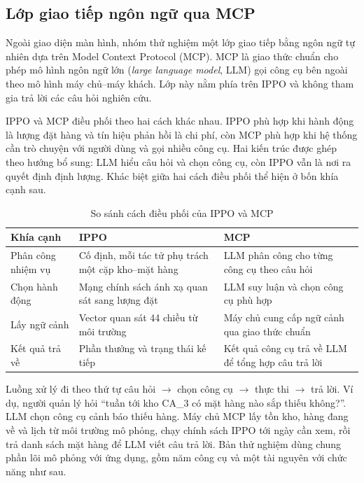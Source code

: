 \subsection{Lớp giao tiếp ngôn ngữ qua MCP}
\label{subsec:mcp}

Ngoài giao diện màn hình, nhóm thử nghiệm một lớp giao tiếp bằng ngôn ngữ tự nhiên dựa trên Model Context Protocol (MCP). MCP là giao thức chuẩn cho phép mô hình ngôn ngữ lớn (\textit{large language model}, LLM) gọi công cụ bên ngoài theo mô hình máy chủ--máy khách. Lớp này nằm phía trên IPPO và không tham gia trả lời các câu hỏi nghiên cứu.

IPPO và MCP điều phối theo hai cách khác nhau. IPPO phù hợp khi hành động là lượng đặt hàng và tín hiệu phản hồi là chi phí, còn MCP phù hợp khi hệ thống cần trò chuyện với người dùng và gọi nhiều công cụ. Hai kiến trúc được ghép theo hướng bổ sung: LLM hiểu câu hỏi và chọn công cụ, còn IPPO vẫn là nơi ra quyết định định lượng. Khác biệt giữa hai cách điều phối thể hiện ở bốn khía cạnh sau.

\begin{table}[H]
    \centering
    \caption{So sánh cách điều phối của IPPO và MCP}
    \label{tab:soSanhMCP}
    \small
    \begin{tabular}{|l|>{\raggedright\arraybackslash}p{5.2cm}|>{\raggedright\arraybackslash}p{5.2cm}|}
        \hline
        Khía cạnh & IPPO & MCP \\
        \hline
        Phân công nhiệm vụ & Cố định, mỗi tác tử phụ trách một cặp kho--mặt hàng & LLM phân công cho từng công cụ theo câu hỏi \\ \hline
        Chọn hành động & Mạng chính sách ánh xạ quan sát sang lượng đặt & LLM suy luận và chọn công cụ phù hợp \\ \hline
        Lấy ngữ cảnh & Vector quan sát 44 chiều từ môi trường & Máy chủ cung cấp ngữ cảnh qua giao thức chuẩn \\ \hline
        Kết quả trả về & Phần thưởng và trạng thái kế tiếp & Kết quả công cụ trả về LLM để tổng hợp câu trả lời \\
        \hline
    \end{tabular}
\end{table}

Luồng xử lý đi theo thứ tự câu hỏi $\rightarrow$ chọn công cụ $\rightarrow$ thực thi $\rightarrow$ trả lời. Ví dụ, người quản lý hỏi ``tuần tới kho CA\_3 có mặt hàng nào sắp thiếu không?''. LLM chọn công cụ cảnh báo thiếu hàng. Máy chủ MCP lấy tồn kho, hàng đang về và lịch từ môi trường mô phỏng, chạy chính sách IPPO tới ngày cần xem, rồi trả danh sách mặt hàng để LLM viết câu trả lời. Bản thử nghiệm dùng chung phần lõi mô phỏng với ứng dụng, gồm năm công cụ và một tài nguyên với chức năng như sau.

